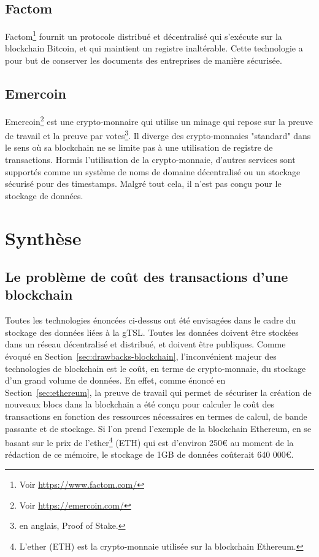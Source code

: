 \documentclass{tnreport}
\begin{document}
\subsection{Factom}

Factom\footnote{Voir \url{https://www.factom.com/}} fournit un protocole distribué et décentralisé qui s'exécute sur la blockchain Bitcoin, et qui maintient un registre inaltérable. Cette technologie a pour but de conserver les documents des entreprises de manière sécurisée.

\subsection{Emercoin}

Emercoin\footnote{Voir \url{https://emercoin.com/}} est une crypto-monnaire qui utilise un minage qui repose sur la preuve de travail et la preuve par votes\footnote{en anglais, Proof of Stake.}. Il diverge des crypto-monnaies "standard" dans le sens où sa blockchain ne se limite pas à une utilisation de registre de transactions. Hormis l'utilisation de la crypto-monnaie, d'autres services sont supportés comme un système de noms de domaine décentralisé ou un stockage sécurisé pour des timestamps. Malgré tout cela, il n'est pas conçu pour le stockage de données.

\section{Synthèse}

\subsection{Le problème de coût des transactions d'une blockchain}

Toutes les technologies énoncées ci-dessus ont été envisagées dans le cadre du stockage des données liées à la gTSL. Toutes les données doivent être stockées dans un réseau décentralisé et distribué, et doivent être publiques. Comme évoqué en Section~\ref{sec:drawbacks-blockchain}, l'inconvénient majeur des technologies de blockchain est le coût, en terme de crypto-monnaie, du stockage d'un grand volume de données. En effet, comme énoncé en Section~\ref{sec:ethereum}, la preuve de travail qui permet de sécuriser la création de nouveaux blocs dans la blockchain a été conçu pour calculer le coût des transactions en fonction des ressources nécessaires en termes de calcul, de bande passante et de stockage. Si l'on prend l'exemple de la blockchain Ethereum, en se basant sur le prix de l'ether\footnote{L'ether (ETH) est la crypto-monnaie utilisée sur la blockchain Ethereum.} (ETH) qui est d'environ 250€ au moment de la rédaction de ce mémoire, le stockage de 1GB de données coûterait 640 000€.
\end{document}
